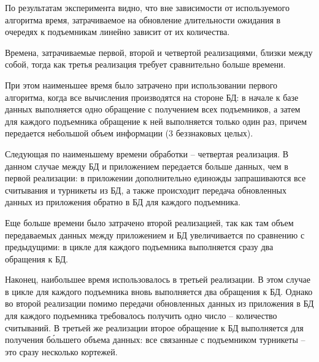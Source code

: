 По результатам эксперимента видно, что вне зависимости от используемого алгоритма время, затрачиваемое на обновление длительности ожидания в очередях к подъемникам линейно зависит от их количества. 

Времена, затрачиваемые первой, второй и четвертой реализациями, близки между собой, тогда как третья реализация требует сравнительно больше времени.

При этом наименьшее время было затрачено при использовании первого алгоритма, когда все вычисления производятся на стороне БД: в начале к базе данных выполняется одно обращение с получением всех подъемников, а затем для каждого подъемника обращение к ней выполняется только один раз, причем передается небольшой объем информации (3 беззнаковых целых).

Следующая по наименьшему времени обработки -- четвертая реализация. В данном случае между БД и приложением передается больше данных, чем в первой реализации: в приложении дополнительно единожды запрашиваются все считывания и турникеты из БД, а также происходит передача обновленных данных из приложения обратно в БД для каждого подъемника.

Еще больше времени было затрачено второй реализацией, так как там объем передаваемых данных между приложением и БД увеличивается по сравнению с предыдущими: в цикле для каждого подъемника выполняется сразу два обращения к БД. 

Наконец, наибольшее время использовалось в третьей реализации. В этом случае в цикле для каждого подъемника вновь выполняется два обращения к БД. Однако во второй реализации помимо передачи обновленных данных из приложения в БД для каждого подъемника требовалось получить одно число -- количество считываний. В третьей же реализации второе обращение к БД выполняется для получения б\'{о}льшего объема данных: все связанные с подъемником турникеты -- это сразу несколько кортежей.

